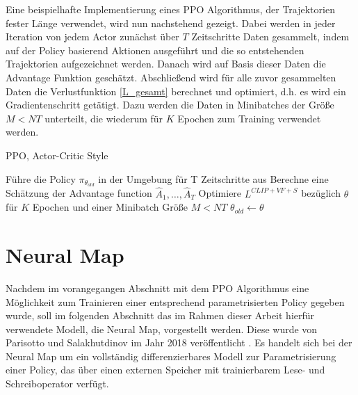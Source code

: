 Eine beispielhafte Implementierung eines PPO Algorithmus, der Trajektorien fester Länge verwendet, wird nun nachstehend gezeigt. Dabei werden in jeder Iteration von jedem Actor zunächst über $T$ Zeitschritte Daten gesammelt, indem auf der Policy basierend Aktionen ausgeführt und die so entstehenden Trajektorien aufgezeichnet werden. Danach wird auf Basis dieser Daten die Advantage Funktion geschätzt. Abschließend wird für alle zuvor gesammelten Daten die Verlustfunktion \eqref{L_gesamt} berechnet und optimiert, d.h. es wird ein Gradientenschritt getätigt. Dazu werden die Daten in Minibatches der Größe $M<NT$ unterteilt, die wiederum für $K$ Epochen zum Training verwendet werden.

\begin{algorithm}
	\caption{\ac{PPO}, Actor-Critic Style}
	\begin{algorithmic}
        \State Führe die Policy $\pi_{\theta_{old}}$ in der Umgebung für T Zeitschritte aus
				\State Berechne eine Schätzung der Advantage function $\hat{A}_1,\dots,\hat{A}_T$
			\EndFor
			\State Optimiere $L^{CLIP+VF+S}$ bezüglich $\theta$ für $K$ Epochen und einer Minibatch Größe $M<NT$
			\State $\theta_{old} \gets \theta$
		\EndFor
	\end{algorithmic}
\end{algorithm}


\section{Neural Map}
\label{sec_neural_map}

Nachdem im vorangegangen Abschnitt mit dem PPO Algorithmus eine Möglichkeit zum Trainieren einer entsprechend parametrisierten Policy gegeben wurde, soll im folgenden Abschnitt das im Rahmen dieser Arbeit hierfür verwendete Modell, die Neural Map, vorgestellt werden. Diese wurde von Parisotto und Salakhutdinov im Jahr 2018 veröffentlicht \cite{NeuralMap}. Es handelt sich bei der Neural Map um ein vollständig differenzierbares Modell zur Parametrisierung einer Policy, das über einen externen Speicher mit trainierbarem Lese- und Schreiboperator verfügt.

